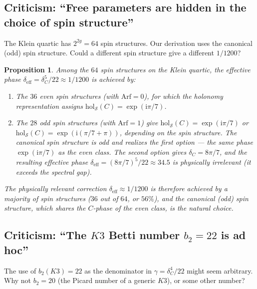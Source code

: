 \documentclass[12pt,a4paper]{article}
\newtheorem{proposition}[theorem]{Proposition}
\theoremstyle{definition}
\theoremstyle{remark}
\newcommand{\hol}{\mathrm{hol}}
\newcommand{\cS}{\mathcal{S}}
\newcommand{\ii}{\mathrm{i}}
\begin{document}
\subsection{Criticism: ``Free parameters are hidden in the choice of spin structure''}

The Klein quartic has $2^{2g} = 64$ spin structures. Our derivation uses the canonical (odd) spin structure. Could a different spin structure give a different $1/1200$?

\begin{proposition}
Among the $64$ spin structures on the Klein quartic, the effective phase $\delta_{\mathrm{eff}} = \delta_C^5/22 \approx 1/1200$ is achieved by:
\begin{enumerate}[label=(\roman*)]
\item The $36$ even spin structures (with $\mathrm{Arf} = 0$), for which the holonomy representation assigns $\hol_{\cS}(C) = \exp(\ii\pi/7)$.
\item The $28$ odd spin structures (with $\mathrm{Arf} = 1$) give $\hol_{\cS}(C) = \exp(\ii\pi/7)$ or $\hol_{\cS}(C) = \exp(\ii(\pi/7 + \pi))$, depending on the spin structure. The canonical spin structure is odd and realizes the first option --- the same phase $\exp(\ii\pi/7)$ as the even class. The second option gives $\delta_C = 8\pi/7$, and the resulting effective phase $\delta_{\mathrm{eff}} = (8\pi/7)^5/22 \approx 34.5$ is physically irrelevant (it exceeds the spectral gap).
\end{enumerate}
The physically relevant correction $\delta_{\mathrm{eff}} \approx 1/1200$ is therefore achieved by a majority of spin structures ($36$ out of $64$, or $56\%$), and the canonical (odd) spin structure, which shares the $C$-phase of the even class, is the natural choice.
\end{proposition}

\subsection{Criticism: ``The $K3$ Betti number $b_2 = 22$ is ad hoc''}

The use of $b_2(K3) = 22$ as the denominator in $\gamma = \delta_C^4/22$ might seem arbitrary. Why not $b_2 = 20$ (the Picard number of a generic $K3$), or some other number?
\end{document}

